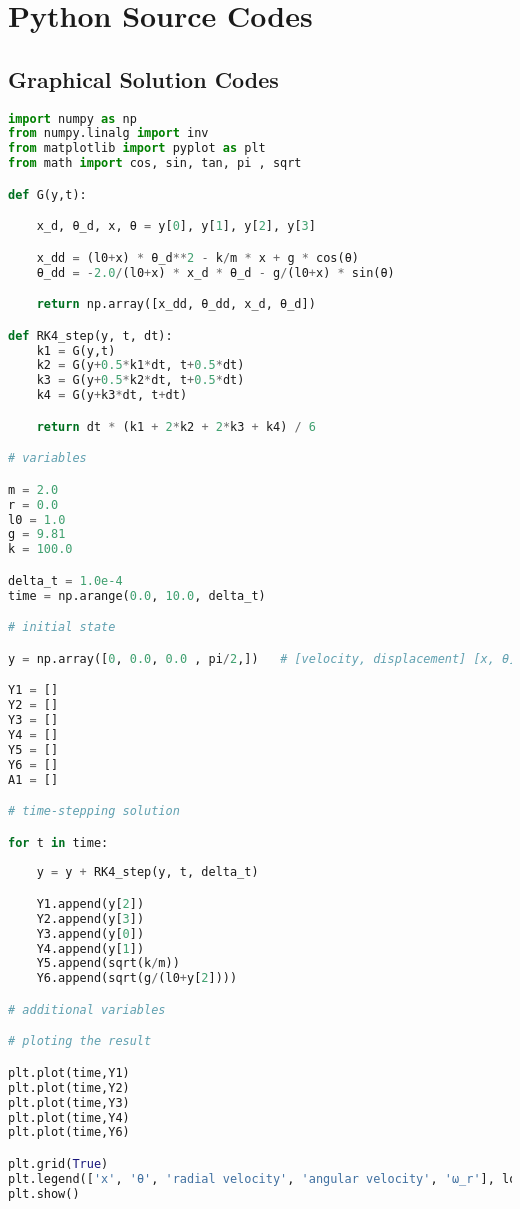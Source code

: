 \newpage

\chapter{{Python Source Codes}}\label{pycode}
        
    \section{{Graphical Solution Codes}}
        
        \begin{lstlisting}[language=Python, caption=\textit{Graphical Solution Python Script for system \textbf{without} Damping}]
import numpy as np 
from numpy.linalg import inv
from matplotlib import pyplot as plt
from math import cos, sin, tan, pi , sqrt

def G(y,t): 	

    x_d, θ_d, x, θ = y[0], y[1], y[2], y[3]

	x_dd = (l0+x) * θ_d**2 - k/m * x + g * cos(θ) 	
	θ_dd = -2.0/(l0+x) * x_d * θ_d - g/(l0+x) * sin(θ) 	

	return np.array([x_dd, θ_dd, x_d, θ_d])

def RK4_step(y, t, dt):
	k1 = G(y,t)
	k2 = G(y+0.5*k1*dt, t+0.5*dt)
	k3 = G(y+0.5*k2*dt, t+0.5*dt)
	k4 = G(y+k3*dt, t+dt)

	return dt * (k1 + 2*k2 + 2*k3 + k4) / 6

# variables

m = 2.0
r = 0.0
l0 = 1.0
g = 9.81
k = 100.0

delta_t = 1.0e-4
time = np.arange(0.0, 10.0, delta_t)

# initial state

y = np.array([0, 0.0, 0.0 , pi/2,])   # [velocity, displacement] [x, θ] 

Y1 = []
Y2 = []
Y3 = []
Y4 = []
Y5 = []
Y6 = []
A1 = []

# time-stepping solution

for t in time:
	
	y = y + RK4_step(y, t, delta_t) 

	Y1.append(y[2])
	Y2.append(y[3])
	Y3.append(y[0])
	Y4.append(y[1])
	Y5.append(sqrt(k/m))
	Y6.append(sqrt(g/(l0+y[2])))

# additional variables

# ploting the result

plt.plot(time,Y1)
plt.plot(time,Y2)
plt.plot(time,Y3)
plt.plot(time,Y4)
plt.plot(time,Y6)

plt.grid(True)
plt.legend(['x', 'θ', 'radial velocity', 'angular velocity', 'ω_r'], loc='lower right')
plt.show()

\end{lstlisting}
        
